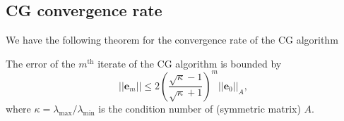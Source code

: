 \subsection{CG convergence rate}\label{sec:cg_convergence_rate}
We have the following theorem for the convergence rate of the CG algorithm
\begin{theorem}
  The error of the $m^{\text{th}}$ iterate of the CG algorithm is bounded by
  \begin{equation}
    ||\mathbf{e}_m|| \leq 2 \left(\frac{\sqrt{\kappa}-1}{\sqrt{\kappa} + 1}\right)^m ||\mathbf{e}_0||_A,
    \label{eq:cg_convergence_rate_bound}
  \end{equation}
  where $\kappa = \lambda_{\text{max}}/\lambda_{\text{min}}$ is the condition number of (symmetric matrix) $A$.
  \label{th:cg_convergence_rate_bound}
\end{theorem}

